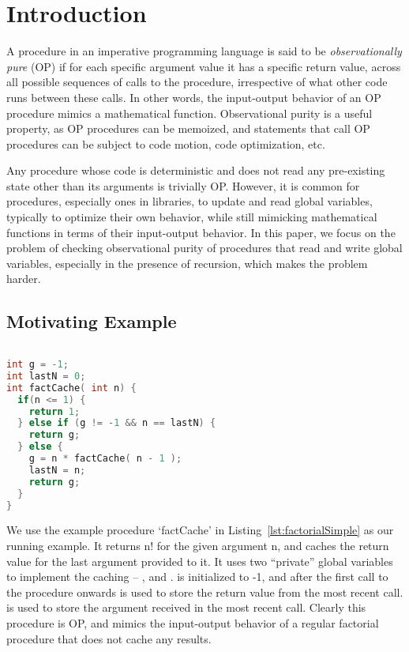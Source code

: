 \section{Introduction}

A procedure in an imperative programming language is said to be
\emph{observationally pure} (OP) if for each specific argument value it has
a specific return value, across all possible sequences of calls to the
procedure, irrespective of what other code runs between these calls.  In
other words, the input-output behavior of an OP procedure mimics a mathematical
function. Observational purity is a useful property, as OP procedures can be memoized, and
statements that call OP procedures can be subject to code motion, code
optimization, etc.

Any procedure whose code is deterministic and does not read any
pre-existing state other than its arguments is trivially OP.
However, it is common for procedures, especially ones in libraries,
to update and read global variables, typically to optimize their own behavior,
while still mimicking mathematical functions in terms of their input-output behavior.
In this paper, we focus on the problem of checking observational purity of
procedures that read and write global variables, especially in the presence of recursion,
which makes the problem harder.

\subsection{Motivating Example}

\begin{lstlisting}[float,language=c, caption= {Procedure `factCache' :
      returns n! and memoizes result for last argument seen.},
    label=lst:factorialSimple]
  
int g = -1;
int lastN = 0;
int factCache( int n) {
  if(n <= 1) {
    return 1;
  } else if (g != -1 && n == lastN) {
    return g;
  } else {
    g = n * factCache( n - 1 );
    lastN = n;
    return g;
  }
}
\end{lstlisting}

We use the example procedure `factCache' in
Listing~\ref{lst:factorialSimple}  as our running example. It
returns n! for the given argument n, and caches the return value for the
last argument provided to it. It uses two ``private'' global variables to
implement the caching -- , and .  is initialized to -1, and after
the first call to the procedure onwards is used to store the return value
from the most recent call.  is used to store the argument received in
the most recent call. Clearly this procedure is OP, and mimics the
input-output behavior of a regular factorial procedure that does not cache
any results. 

